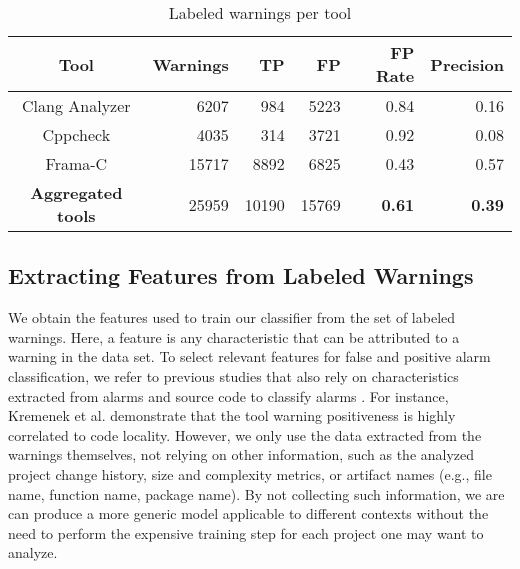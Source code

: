   \begin{table}
    \begin{center}
        \begin{tabular}{crrrrr}\hline
          Tool & Warnings & TP & FP & FP Rate & Precision \\
        \hline
          Clang Analyzer & 6207 & 984 & 5223 & 0.84 & 0.16 \\
          Cppcheck & 4035 & 314 & 3721 & 0.92 & 0.08 \\
          Frama-C & 15717 & 8892 & 6825 & 0.43 & 0.57 \\
          \textbf{Aggregated tools} & 25959 & 10190 & 15769 & \textbf{0.61}  & \textbf{0.39} \\ \hline
        \end{tabular}
        \caption{Labeled warnings per tool}\label{tab:labeled_warnings}
    \end{center}
\end{table}


\subsection{Extracting Features from Labeled Warnings}\label{sec:data:features}


We obtain the features used to train our classifier from the set of labeled
warnings. Here, a feature is any characteristic that can be attributed to a
warning in the data set. To select relevant features for false and positive
alarm classification, we refer to previous studies that also rely on
characteristics extracted from alarms and source code to classify alarms
\cite{ruthruff_predicting_2008, kremenek2004correlation, heckman2009model,
jung2005taming}. For instance, Kremenek et al. \cite{kremenek2004correlation}
demonstrate that the tool warning positiveness is highly correlated to code
locality.  However, we only use the data extracted from the warnings
themselves, not relying on other information, such as the analyzed project
change history, size and complexity metrics, or artifact names (e.g., file name,
function name, package name). By not collecting such information, we are can
produce a more generic model applicable to different contexts without the
need to perform the expensive training step for each project one may want to
analyze.

